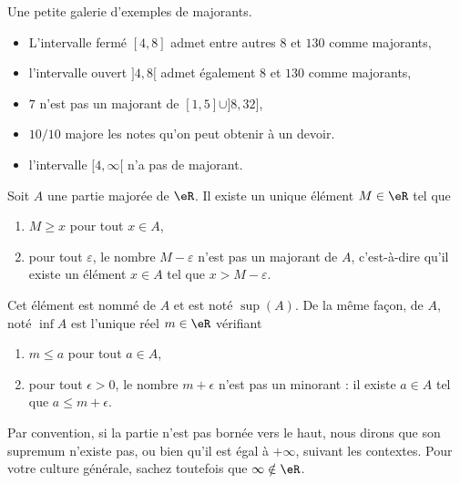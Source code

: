 \begin{example}
	Une petite galerie d'exemples de majorants.
	\begin{itemize}
		\item L'intervalle fermé \( [4,8]\) admet entre autres \( 8\) et \( 130\) comme majorants,
		\item l'intervalle ouvert \( ]4,8[\) admet également \( 8\) et \( 130\) comme majorants,
		\item \( 7\) n'est pas un majorant de \( [1,5]\cup]8,32]\),
		\item \( 10/10\) majore les notes qu'on peut obtenir à un devoir.
		\item l'intervalle \( [4,\infty[\) n'a pas de majorant.
	\end{itemize}
\end{example}

\begin{propositionDef}		\label{DefSupeA}
	Soit \( A\) une partie majorée de \( \eR\). Il existe un unique élément \( M\in \eR\) tel que
	\begin{enumerate}
		\item
		      \( M\geq x\) pour tout \( x\in A\),
		\item
		      pour tout \( \varepsilon\), le nombre \( M-\varepsilon\) n'est pas un majorant de \( A\), c'est-à-dire qu'il existe un élément \( x\in A\) tel que \( x>M-\varepsilon\).
	\end{enumerate}

	Cet élément est nommé  de \( A\) et est noté \( \sup(A)\). De la même façon,  de \( A\), noté \( \inf A\) est l'unique réel \( m\in\eR\) vérifiant
	\begin{enumerate}
		\item
		      \( m\leq a\) pour tout \( a\in A\),
		\item
		      pour tout \( \epsilon>0\), le nombre \( m+\epsilon\) n'est pas un minorant : il existe \( a\in A\) tel que \( a\leq m+\epsilon\).
	\end{enumerate}
\end{propositionDef}

Par convention, si la partie n'est pas bornée vers le haut, nous dirons que son supremum n'existe pas, ou bien qu'il est égal à \( +\infty\), suivant les contextes. Pour votre culture générale, sachez toutefois que \( \infty\notin\eR\).

